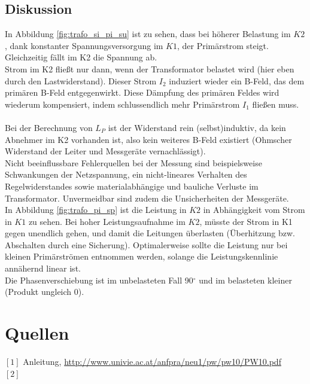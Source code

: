 \documentclass[12pt,a4paper]{article}
\begin{document}
\begin{multicols}{2}

\subsection{Diskussion}

In Abbildung \ref{fig:trafo_si_pi_su} ist zu sehen, dass bei höherer Belastung im $K2$, dank konstanter Spannungsversorgung im $K1$, der Primärstrom steigt.
Gleichzeitig fällt im K2 die Spannung ab.\\
Strom im K2 fließt nur dann, wenn der Transformator belastet wird (hier eben durch den Lastwiderstand). Dieser Strom $I_2$ induziert wieder ein B-Feld, das dem primären B-Feld entgegenwirkt. Diese Dämpfung des primären Feldes wird wiederum kompensiert, indem schlussendlich mehr Primärstrom $I_1$ fließen muss.\\
\\
Bei der Berechnung von $L_P$ ist der Widerstand rein (selbst)induktiv, da kein Abnehmer im K2 vorhanden ist, also kein weiteres B-Feld existiert (Ohmscher Widerstand der Leiter und Messgeräte vernachlässigt).\\
Nicht beeinflussbare Fehlerquellen bei der Messung sind beispielsweise Schwankungen der Netzspannung, ein nicht-lineares Verhalten des Regelwiderstandes sowie materialabhängige und bauliche Verluste im Transformator. Unvermeidbar sind zudem die Unsicherheiten der Messgeräte.\\
In Abbildung \ref{fig:trafo_pi_sp} ist die Leistung in $K2$ in Abhängigkeit vom Strom in $K1$ zu sehen. Bei hoher Leistungsaufnahme im $K2$, müsste der Strom in K1 gegen unendlich gehen, und damit die Leitungen überlasten (Überhitzung bzw. Abschalten durch eine Sicherung).
Optimalerweise sollte die Leistung nur bei kleinen Primärströmen entnommen werden, solange die Leistungskennlinie annähernd linear ist.\\
Die Phasenverschiebung ist im unbelasteten Fall 90$^\circ$ und im belasteten kleiner (Produkt ungleich 0).




\section{Quellen}
$[1]$ Anleitung, \url{http://www.univie.ac.at/anfpra/neu1/pw/pw10/PW10.pdf}\\
$[2]$ 
\end{multicols}
\end{document}
